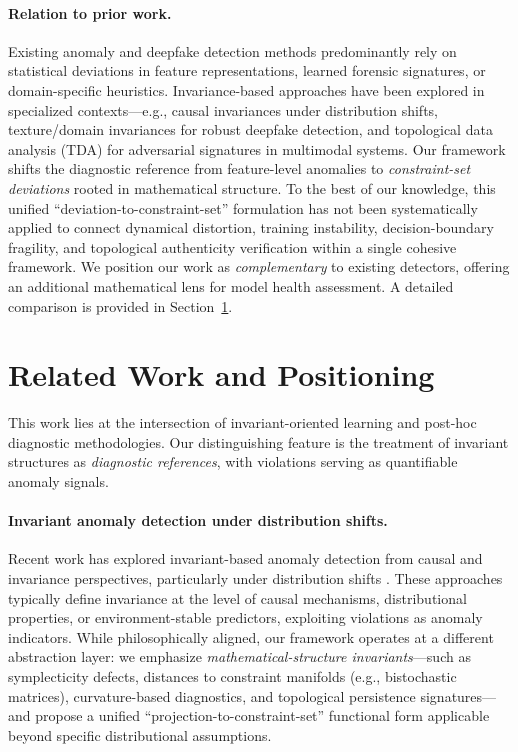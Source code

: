 \documentclass[11pt]{article}
\begin{document}
\paragraph{Relation to prior work.}
Existing anomaly and deepfake detection methods predominantly rely on statistical deviations in feature representations, learned forensic signatures, or domain-specific heuristics. Invariance-based approaches have been explored in specialized contexts---e.g., causal invariances under distribution shifts, texture/domain invariances for robust deepfake detection, and topological data analysis (TDA) for adversarial signatures in multimodal systems. Our framework shifts the diagnostic reference from feature-level anomalies to \emph{constraint-set deviations} rooted in mathematical structure. To the best of our knowledge, this unified ``deviation-to-constraint-set'' formulation has not been systematically applied to connect dynamical distortion, training instability, decision-boundary fragility, and topological authenticity verification within a single cohesive framework. We position our work as \emph{complementary} to existing detectors, offering an additional mathematical lens for model health assessment. A detailed comparison is provided in Section~\ref{sec:related}.

\section{Related Work and Positioning}
\label{sec:related}

This work lies at the intersection of invariant-oriented learning and post-hoc diagnostic methodologies. Our distinguishing feature is the treatment of invariant structures as \emph{diagnostic references}, with violations serving as quantifiable anomaly signals.

\paragraph{Invariant anomaly detection under distribution shifts.}
Recent work has explored invariant-based anomaly detection from causal and invariance perspectives, particularly under distribution shifts \cite{carvalho2023invariant}. These approaches typically define invariance at the level of causal mechanisms, distributional properties, or environment-stable predictors, exploiting violations as anomaly indicators. While philosophically aligned, our framework operates at a different abstraction layer: we emphasize \emph{mathematical-structure invariants}---such as symplecticity defects, distances to constraint manifolds (e.g., bistochastic matrices), curvature-based diagnostics, and topological persistence signatures---and propose a unified ``projection-to-constraint-set'' functional form applicable beyond specific distributional assumptions.
\end{document}
